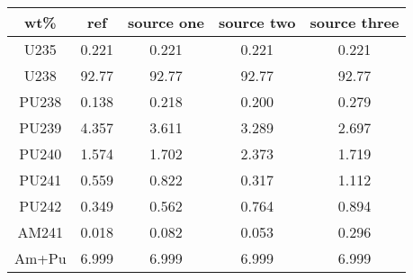	\begin{tabular}{ccccc}
		\hline
		\textbf{wt\%} & \textbf{ref} & \textbf{source one} & \textbf{source two} & \textbf{source three} \\ 
		\hline
		U235 & 0.221 & 0.221 & 0.221 & 0.221 \\ 
		U238 & 92.77 & 92.77 & 92.77 & 92.77 \\ 
		PU238 & 0.138 & 0.218 & 0.200 & 0.279 \\ 
		PU239 & 4.357 & 3.611 & 3.289 & 2.697 \\ 
		PU240 & 1.574 & 1.702 & 2.373 & 1.719 \\ 
		PU241 & 0.559 & 0.822 & 0.317 & 1.112 \\ 
		PU242 & 0.349 & 0.562 & 0.764 & 0.894 \\ 
		AM241 & 0.018 & 0.082 & 0.053 & 0.296 \\ 
		\hline
		\hline
		Am+Pu & 6.999 & 6.999 & 6.999 & 6.999 \\ 
		\hline 
	\end{tabular} 
